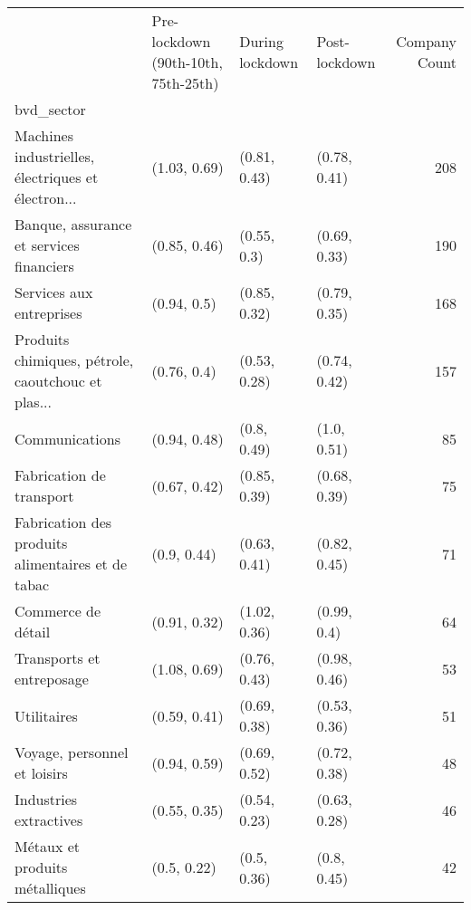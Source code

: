 \begin{tabular}{llllr}
\toprule
{} & Pre-lockdown (90th-10th, 75th-25th) & During lockdown & Post-lockdown &  Company Count \\
bvd\_sector                                         &                                     &                 &               &                \\
\midrule
Machines industrielles, électriques et électron... &                        (1.03, 0.69) &    (0.81, 0.43) &  (0.78, 0.41) &            208 \\
Banque, assurance et services financiers           &                        (0.85, 0.46) &     (0.55, 0.3) &  (0.69, 0.33) &            190 \\
Services aux entreprises                           &                         (0.94, 0.5) &    (0.85, 0.32) &  (0.79, 0.35) &            168 \\
Produits chimiques, pétrole, caoutchouc et plas... &                         (0.76, 0.4) &    (0.53, 0.28) &  (0.74, 0.42) &            157 \\
Communications                                     &                        (0.94, 0.48) &     (0.8, 0.49) &   (1.0, 0.51) &             85 \\
Fabrication de transport                           &                        (0.67, 0.42) &    (0.85, 0.39) &  (0.68, 0.39) &             75 \\
Fabrication des produits alimentaires et de tabac  &                         (0.9, 0.44) &    (0.63, 0.41) &  (0.82, 0.45) &             71 \\
Commerce de détail                                 &                        (0.91, 0.32) &    (1.02, 0.36) &   (0.99, 0.4) &             64 \\
Transports et entreposage                          &                        (1.08, 0.69) &    (0.76, 0.43) &  (0.98, 0.46) &             53 \\
Utilitaires                                        &                        (0.59, 0.41) &    (0.69, 0.38) &  (0.53, 0.36) &             51 \\
Voyage, personnel et loisirs                       &                        (0.94, 0.59) &    (0.69, 0.52) &  (0.72, 0.38) &             48 \\
Industries extractives                             &                        (0.55, 0.35) &    (0.54, 0.23) &  (0.63, 0.28) &             46 \\
Métaux et produits métalliques                     &                         (0.5, 0.22) &     (0.5, 0.36) &   (0.8, 0.45) &             42 \\

\end{tabular}
